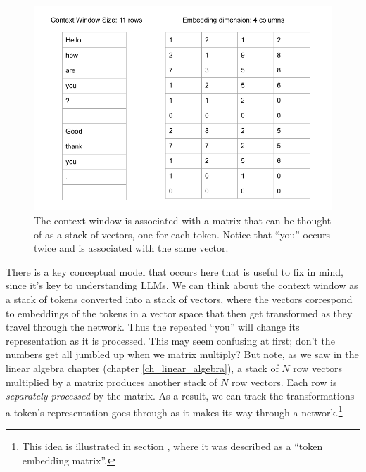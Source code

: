 \begin{figure}[h]
\centering
\includegraphics[scale=.45]{./images/contextWindowAsStack.png}
\caption[Jeff Yoshimi]{The context window is associated with a matrix that can be thought of as a stack of vectors, one for each token. Notice that ``you'' occurs twice and is associated with the same vector.}
\label{nextWordPrediction}
\end{figure}

There is a key conceptual model that occurs here that is useful to fix in mind, since it's key to understanding LLMs. We can think about the context window as a stack of tokens converted into a stack of vectors, where the vectors correspond to embeddings of the tokens in a vector space that then get transformed as they travel through the network. Thus the repeated ``you'' will change its representation as it is processed. This may seem confusing at first; don't the numbers get all jumbled up when we matrix multiply? But note, as we saw in the linear algebra chapter (chapter \ref{ch_linear_algebra}), a stack of $N$ row vectors multiplied by a matrix produces another stack of $N$ row vectors. Each row is \emph{separately processed} by the matrix. As a result, we can track the transformations a token's representation goes through as it makes its way through a network.\footnote{This idea is illustrated in section , where it was described as a ``token embedding matrix''.}

